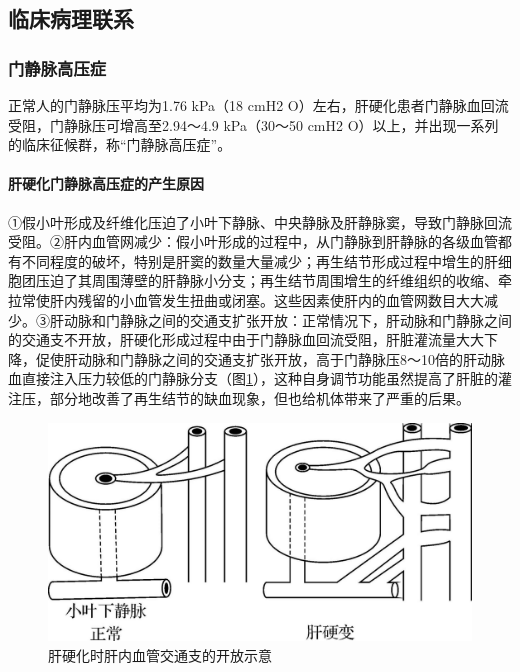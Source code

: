 \subsection{临床病理联系}

\subsubsection{门静脉高压症}

正常人的门静脉压平均为1.76 kPa（18 cmH{2}
O）左右，肝硬化患者门静脉血回流受阻，门静脉压可增高至2.94～4.9
kPa（30～50 cmH{2}
O）以上，并出现一系列的临床征候群，称“门静脉高压症”。

\paragraph{肝硬化门静脉高压症的产生原因}
①假小叶形成及纤维化压迫了小叶下静脉、中央静脉及肝静脉窦，导致门静脉回流受阻。②肝内血管网减少：假小叶形成的过程中，从门静脉到肝静脉的各级血管都有不同程度的破坏，特别是肝窦的数量大量减少；再生结节形成过程中增生的肝细胞团压迫了其周围薄壁的肝静脉小分支；再生结节周围增生的纤维组织的收缩、牵拉常使肝内残留的小血管发生扭曲或闭塞。这些因素使肝内的血管网数目大大减少。③肝动脉和门静脉之间的交通支扩张开放：正常情况下，肝动脉和门静脉之间的交通支不开放，肝硬化形成过程中由于门静脉血回流受阻，肝脏灌流量大大下降，促使肝动脉和门静脉之间的交通支扩张开放，高于门静脉压8～10倍的肝动脉血直接注入压力较低的门静脉分支（图\ref{fig8-10}），这种自身调节功能虽然提高了肝脏的灌注压，部分地改善了再生结节的缺血现象，但也给机体带来了严重的后果。

\begin{figure}[!htbp]
 \centering
 \includegraphics{./images/Image00138.jpg}
 \captionsetup{justification=centering}
 \caption{肝硬化时肝内血管交通支的开放示意}
 \label{fig8-10}
  \end{figure} 

